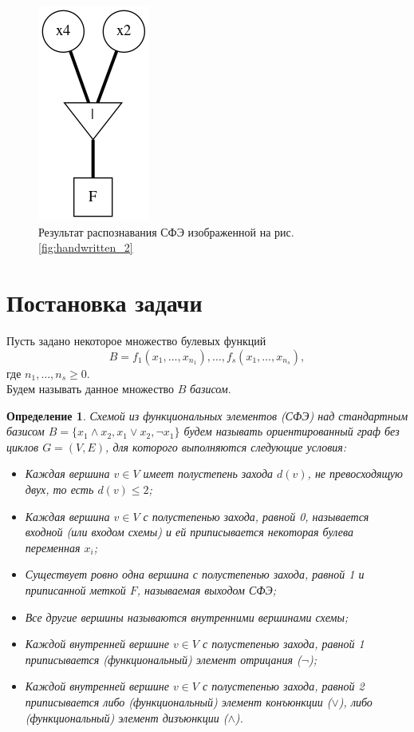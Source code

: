 \documentclass[makeidx, a4paper, 14pt]{extarticle}
\newtheorem{definition}{Определение}
\begin{document}
\begin{figure}[H]
    \centering
    \includegraphics{handwritten_2_result.png}
    \caption{Результат распознавания СФЭ изображенной на рис. \ref{fig:handwritten_2}}
\end{figure}

\section{Постановка задачи}
Пусть задано некоторое множество булевых функций \[{B = {f_1(x_1, \dots, x_{n_1}), \dots, f_s(x_1, \dots, x_{n_s})}}, \]
где $n_1, \dots, n_s \ge 0$. \\ Будем называть данное множество $B$ \emph{базисом}.

\begin{definition}
    Схемой из функциональных элементов (СФЭ) над стандартным базисом ${B = \{x_1 \wedge x_2, x_1 \vee x_2, \neg{x_1}\}}$
    будем называть ориентированный граф без циклов ${G=(V, E)}$, для которого выполняются следующие условия:
    \begin{itemize}
        \item Каждая вершина $v \in V$ имеет полустепень захода $d(v)$, не превосходящую двух, то есть ${d(v) \le 2}$;
        \item Каждая вершина $v \in V$ с полустепенью захода, равной 0, называется входной (или входом схемы) и ей приписывается некоторая булева переменная $x_i$;
        \item Существует ровно одна вершина с полустепенью захода, равной 1 и приписанной меткой $F$, называемая выходом СФЭ;
        \item Все другие вершины называются внутренними вершинами схемы;
        \item Каждой внутренней вершине $v \in V$ с полустепенью захода, равной 1 приписывается (функциональный) элемент отрицания ($\neg$);
        \item Каждой внутренней вершине $v \in V$ с полустепенью захода, равной 2 приписывается либо (функциональный) элемент конъюнкции ($\vee$),
        либо (функциональный) элемент дизъюнкции ($\wedge$).
    \end{itemize}
\end{definition}
\end{document}
